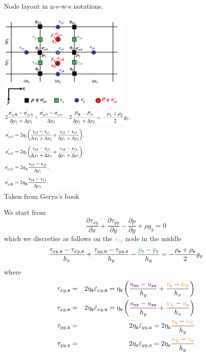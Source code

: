 \begin{multicols}{2}


{\captionfont Node layout in {n-e-w-s} notations.}

\columnbreak

\begin{center}
\includegraphics[width=6.5cm]{images/fdm/gerya_C}\\
\includegraphics[width=7cm]{images/fdm/gerya_E}\\
\includegraphics[width=4.5cm]{images/fdm/gerya_G}\\
{\captionfont Taken from Gerya's book}
\end{center}
\end{multicols}


We start from 
\[
\frac{\partial \tau_{xy}}{\partial x}  + 
\frac{\partial \tau_{yy}}{\partial y}  
- \frac{\partial p}{\partial y} + \rho g_y = 0
\]
which we discretise as follows on the ${\color{orange} v_\otimes}$ node in the middle
\[
\frac{\tau_{xy,{\tt e}}-\tau_{xy,{\tt w}}}{h_x} + \frac{\tau_{yy,{\tt n}}-\tau_{yy,{\tt s}}}{h_y} 
-\frac{{\color{teal}p_{\tt n}}-{\color{teal}p_{\tt s}}}{h_y} 
= -\frac{\rho_{\tt e}+\rho_{\tt w}}{2} g_y
\]
where
\begin{eqnarray}
\tau_{xy,{\tt e}} 
&=& 2 \eta_{\tt e} \dot{\varepsilon}_{xy,{\tt e}} 
= \eta_{\tt e} \left( \frac{{\color{violet} u_{\tt ne}}-{\color{violet} u_{\tt se}}}{h_y} 
+\frac{{\color{orange} v_{\tt e}}-{\color{orange} v_\otimes}}{h_x} \right) 
\nonumber \\
\tau_{xy,{\tt w}} 
&=& 2 \eta_{\tt w} \dot{\varepsilon}_{xy,{\tt w}} 
= \eta_{\tt w} \left( \frac{{\color{violet} u_{\tt nw}}-{\color{violet} u_{\tt sw}}}{h_y} 
+\frac{{\color{orange} v_\otimes} - {\color{orange} v_{\tt w}}}{h_x} \right) 
\nonumber\\
\tau_{yy,{\tt n}} 
&=& 2 \eta_{\tt n} \dot{\varepsilon}_{yy,{\tt n}} 
= 2\eta_{\tt n} \frac{{\color{orange} v_{\tt n}}-{\color{orange} v_\otimes}}{h_y} 
\nonumber\\
\tau_{yy,{\tt s}} 
&=& 2 \eta_{\tt s} \dot{\varepsilon}_{yy,{\tt s}} 
= 2\eta_{\tt s} \frac{{\color{orange} v_\otimes} -{\color{orange} v_{\tt s}}}{h_y} 
 \nonumber
\end{eqnarray}

